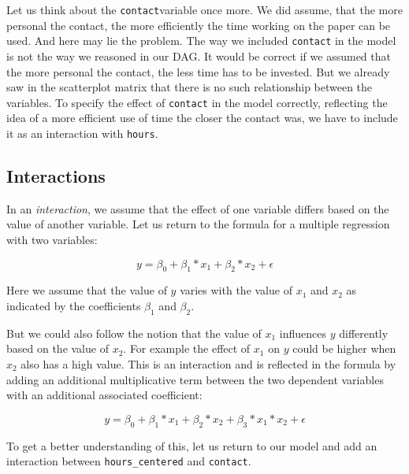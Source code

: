 \documentclass[
]{book}
\begin{document}
Let us think about the \texttt{contact}variable once more.
We did assume, that the more personal the contact, the more efficiently the time
working on the paper can be used. And here may lie the problem. The way we included
\texttt{contact} in the model is not the way we reasoned in our DAG. It would be
correct if we assumed that the more personal the contact, the less time has to
be invested. But we already saw in the scatterplot matrix that there is no such
relationship between the variables. To specify the effect of \texttt{contact} in the
model correctly, reflecting the idea of a more efficient use of time the closer
the contact was, we have to include it as an interaction with \texttt{hours}.

\hypertarget{interactions}{%
\subsection{Interactions}\label{interactions}}

In an \emph{interaction}, we assume that the effect of one variable differs based on
the value of another variable. Let us return to the formula for a multiple
regression with two variables:

\[y = \beta_0 + \beta_1*x_1 + \beta_2*x_2 + \epsilon\]

Here we assume that the value of \(y\) varies with the value of \(x_1\) and \(x_2\) as
indicated by the coefficients \(\beta_1\) and \(\beta_2\).

But we could also follow the notion that the value of \(x_1\) influences \(y\)
differently based on the value of \(x_2\). For example the effect of \(x_1\) on \(y\)
could be higher when \(x_2\) also has a high value. This is an interaction and is
reflected in the formula by adding an additional multiplicative term between
the two dependent variables with an additional associated coefficient:

\[y = \beta_0 + \beta_1*x_1 + \beta_2*x_2 + \beta_3 * x_1 * x_2 + \epsilon\]

To get a better understanding of this, let us return to our model and add an
interaction between \texttt{hours\_centered} and \texttt{contact}.
\end{document}
